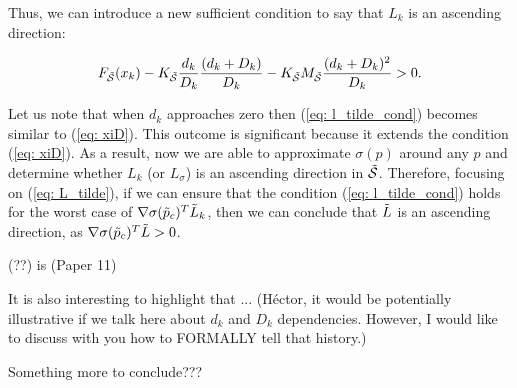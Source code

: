 Thus, we can introduce a new sufficient condition to say that $L_k$ is an ascending direction:

\begin{equation}\label{eq: l_tilde_cond}
        F_{\Tilde{\mathcal{S}}} (x_k) 
        - K_{\Tilde{\mathcal{S}}} \frac{d_k}{D_k} \frac{(d_k + D_k)}{D_k} 
        - K_{\Tilde{\mathcal{S}}} M_{\Tilde{\mathcal{S}}} \frac{(d_k + D_k)^2}{D_k} > 0.
\end{equation}

Let us note that when $d_k$ approaches zero then (\ref{eq: l_tilde_cond}) becomes similar to (\ref{eq: xiD}). This outcome is significant because it extends the condition (\ref{eq: xiD}). As a result, now we are able to approximate $\sigma(p)$ around any $p$ and determine whether $L_k$ (or $L_\sigma$) is an ascending direction in $\Tilde{\mathcal{S}}$. Therefore, focusing on (\ref{eq: L_tilde}), if we can ensure that the condition (\ref{eq: l_tilde_cond}) holds for the worst case of $\nabla\sigma(\Tilde p_c)^T \Tilde{L}_k$, then we can conclude that $\Tilde{L}$ is an ascending direction, as $\nabla\sigma(\Tilde p_c)^T \Tilde{L} > 0$.

{\color{red} (??) is (Paper 11)}

It is also interesting to highlight that {\color{red} ... (Héctor, it would be potentially illustrative if we talk here about $d_k$ and $D_k$ dependencies. However, I would like to discuss with you how to FORMALLY tell that history.)}

{\color{red} Something more to conclude???} 






